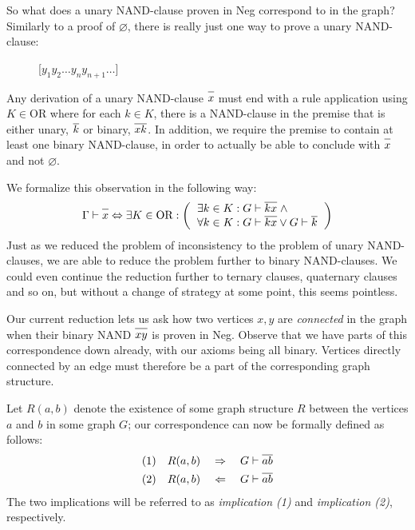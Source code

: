 So what does a unary NAND-clause proven in Neg correspond to in the graph?
Similarly to a proof of $\varnothing$, there is really just one way to prove a unary NAND-clause:\par
\begin{figure}[!h]
  \centering
  \begin{prooftree*}
    \Hypo{\dots}
    \Hypo{\dots}
    [$y_1y_2\dots y_ny_{n+1}\dots$]{}
  \end{prooftree*}
  \caption{}
  \label{fig:proof_unary_nand}
\end{figure}
Any derivation of a unary NAND-clause $\ol{x}$ must end with a rule application using $K \in \text{OR}$ where for each $k \in K$, there is a NAND-clause in the premise that is either unary, $\ol{k}$ or binary, $\ol{xk}$.
In addition, we require the premise to contain at least one binary NAND-clause, in order to actually be able to conclude with $\ol x$ and not $\varnothing$.

We formalize this observation in the following way:
\begin{align}
  \Gamma \vdash \ol{x} \Leftrightarrow \exists K \in \text{OR}:
  \left ( \begin{tabular}{l}
  $\exists k \in K: G \vdash \ol{kx} \; \wedge$\\
  $\forall k \in K: G \vdash \ol{kx} \vee G \vdash \ol{k}$
  \end{tabular} \right )
\end{align}
Just as we reduced the problem of inconsistency to the problem of unary NAND-clauses, we are able to reduce the problem further to binary NAND-clauses.
We could even continue the reduction further to ternary clauses, quaternary clauses and so on, but without a change of strategy at some point, this seems pointless.

Our current reduction lets us ask how two vertices $x,y$ are \textit{connected} in the graph when their binary NAND $\ol{xy}$ is proven in Neg.
Observe that we have parts of this correspondence down already, with our axioms being all binary.
Vertices directly connected by an edge must therefore be a part of the corresponding graph structure.

Let $R(a,b)$ denote the existence of some graph structure $R$ between the vertices $a$ and $b$ in some graph $G$; our correspondence can now be formally defined as follows:
\begin{align}
  (1) \quad R(a,b) \quad \Rightarrow \quad G \vdash \ol{ab}\\
  (2) \quad R(a,b) \quad \Leftarrow \quad G \vdash \ol{ab}
\end{align}
The two implications will be referred to as \textit{implication (1)} and \textit{implication (2)}, respectively.

